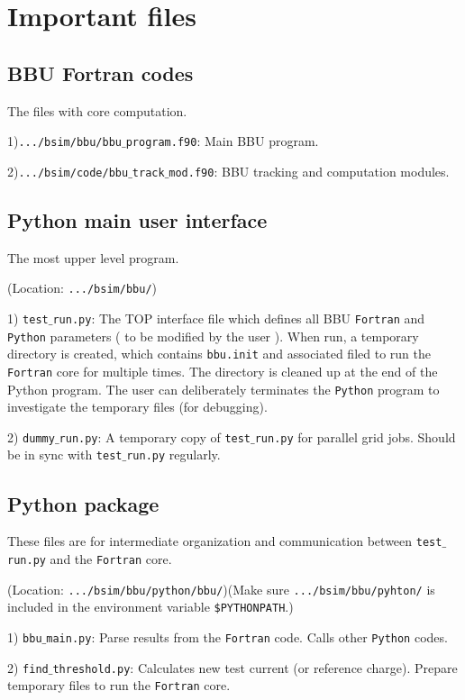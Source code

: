 \documentclass{article}
\begin{document}
\section{Important files}
\subsection{BBU Fortran codes}
The files with core computation.

1)\texttt{.../bsim/bbu/bbu$\_$program.f90}: Main BBU program.

2)\texttt{.../bsim/code/bbu$\_$track$\_$mod.f90}: BBU tracking and computation modules.

\subsection{ Python main user interface}
The most upper level program.

(Location: \texttt{.../bsim/bbu/})

1) \texttt{test$\_$run.py}: 
The TOP interface file which defines all BBU \texttt{Fortran} and \texttt{Python} parameters ( to be modified by the user ).
When run, a temporary directory is created, which contains \texttt{bbu.init} and associated filed to run the \texttt{Fortran} core for multiple times. The directory is cleaned up at the end of the Python program. The user can deliberately terminates the \texttt{Python} program to investigate the temporary files (for debugging).

2) \texttt{dummy$\_$run.py}: 
A temporary copy of \texttt{test$\_$run.py} for parallel grid jobs. Should be in sync with \texttt{test$\_$run.py} regularly.  


\subsection{Python package}
These files are for intermediate  organization and communication between \texttt{test$\_$run.py} and the \texttt{Fortran} core.

(Location: \texttt{.../bsim/bbu/python/bbu/})(Make sure \texttt{.../bsim/bbu/pyhton/} is included in the environment variable \texttt{\$PYTHONPATH}.)

1) \texttt{bbu$\_$main.py}: Parse results from the \texttt{Fortran} code. Calls other \texttt{Python} codes.

2) \texttt{find$\_$threshold.py}: Calculates new test current (or reference charge). Prepare temporary files to run the \texttt{Fortran} core.
\end{document}
